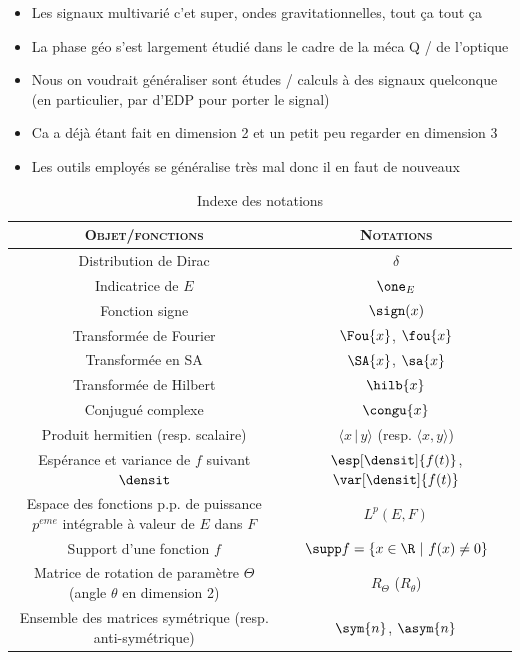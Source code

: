 \begin{itemize}
	
	\item Les signaux multivarié c'et super, ondes gravitationnelles, tout ça tout ça
	
	\item La phase géo s'est largement étudié dans le cadre de la méca Q / de l'optique
	
	\item Nous on voudrait généraliser sont études / calculs à des signaux quelconque (en particulier, par d'EDP pour porter le signal)
	
	\item Ca a déjà étant fait en dimension 2 et un petit peu regarder en dimension 3
	
	\item Les outils employés se généralise très mal donc il en faut de nouveaux
	
\end{itemize}


\begin{table}[b]\centering
	\begin{tabular}{|| c | c ||} \hline
		\textsc{Objet/fonctions}  & \textsc{Notations} \\
		\hline\hline
	 	Distribution de Dirac   &  $\delta$\\ \hline 
		Indicatrice de $E$   	 &  $\one_E$ \\ \hline 
		Fonction signe   		    &  $\sign(x)$ \\ \hline
		Transformée de Fourier   						&  $\Fou{x}$, $\fou{x}$ \\ \hline
		Transformée en SA   		  &  $\SA{x}$, $\sa{x}$ \\ \hline
		Transformée de Hilbert   	&  $\hilb{x}$ \\ \hline
		Conjugué complexe  					 &  $\congu{x}$ \\ \hline
		Produit hermitien (resp. scalaire)   &  $\langle x \,|\, y\rangle$ (resp. $\langle x,y\rangle$) \\ \hline
		Espérance et variance de $f$ suivant $\densit$   &  $\esp[\densit]{f(t)}$, $\var[\densit]{f(t)}$ \\  \hline
		Espace des fonctions p.p. de puissance $p^{eme}$ intégrable à valeur de $E$ dans $F$  &  $L^p(E, F)$ \\  \hline		
		Support d'une fonction $f$   &  $\supp f =\{x\in\R\ |\ f(x)\neq0\}$ \\  \hline
		Matrice de rotation de paramètre $\Theta$ (angle $\theta$ en dimension 2)  &  $R_\Theta$ ($R_\theta$)  \\  \hline
		Ensemble des matrices symétrique (resp. anti-symétrique)  &  $\sym{n}$, $\asym{n}$  \\  \hline
		
	\end{tabular}
	\caption{Indexe des notations}
	\label{tab:notation}
\end{table}




